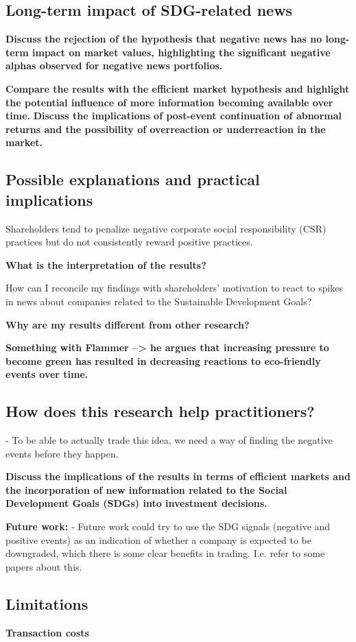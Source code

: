 \subsection{Long-term impact of SDG-related news}
\textbf{Discuss the rejection of the hypothesis that negative news has no long-term impact on market values, highlighting the significant negative alphas observed for negative news portfolios.}

\textbf{Compare the results with the efficient market hypothesis and highlight the potential influence of more information becoming available over time.}
\textbf{Discuss the implications of post-event continuation of abnormal returns and the possibility of overreaction or underreaction in the market.}


\subsection{Possible explanations and practical implications}

Shareholders tend to penalize negative corporate social responsibility (CSR) practices but do not consistently reward positive practices. 

\textbf{What is the interpretation of the results?}

How can I reconcile my findings with shareholders' motivation to react to spikes in news about companies related to the Sustainable Development Goals? 


\textbf{Why are my results different from other research?}

\textbf{Something with Flammer --> he argues that increasing pressure to become green has resulted in decreasing reactions to eco-friendly events over time.}


\subsection{How does this research help practitioners?}
- To be able to actually trade this idea, we need a way of finding the negative events before they happen. 


\textbf{Discuss the implications of the results in terms of efficient markets and the incorporation of new information related to the Social Development Goals (SDGs) into investment decisions.}


\textbf{Future work:}
- Future work could try to use the SDG signals (negative and positive events) as an indication of whether a company is expected to be downgraded, which there is some clear benefits in trading. I.e. refer to some papers about this. 

\subsection{Limitations}


\textbf{Transaction costs}
